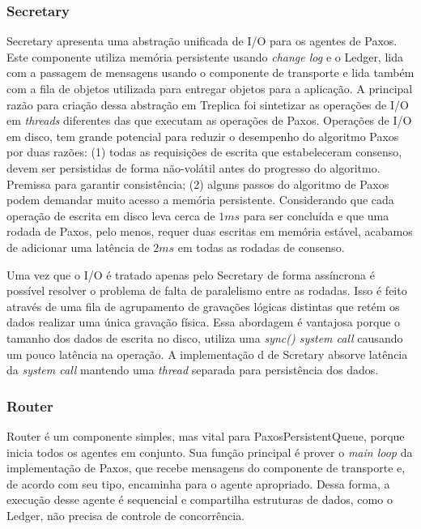 \subsubsection{Secretary}\label{subsec:secretary}

Secretary apresenta uma abstração unificada de I/O para os agentes de Paxos. Este
componente utiliza memória persistente usando \emph{change log} e o Ledger, lida com a
passagem de mensagens usando o componente de transporte e lida também com a fila de
objetos utilizada para entregar objetos para a aplicação. A principal razão para criação
dessa abstração em Treplica foi sintetizar as operações de I/O em \emph{threads}
diferentes das que executam as operações de Paxos. Operações de I/O em disco, tem grande
potencial para reduzir o desempenho do algoritmo Paxos por duas razões: (1) todas as
requisições de escrita que estabeleceram consenso, devem ser persistidas de forma
não-volátil antes do progresso do algoritmo. Premissa para garantir consistência; (2)
alguns passos do algoritmo de Paxos podem demandar muito acesso a memória persistente.
Considerando que cada operação de escrita em disco leva cerca de $1ms$ para ser concluída
e que uma rodada de Paxos, pelo menos, requer duas escritas em memória estável, acabamos
de adicionar uma latência de $2ms$ em todas as rodadas de consenso.

Uma vez que o I/O é tratado apenas pelo Secretary de forma assíncrona é possível resolver
o problema de falta de paralelismo entre as rodadas. Isso é feito através de uma fila de
agrupamento de gravações lógicas distintas que retém os dados realizar uma única gravação
física. Essa abordagem é vantajosa porque o tamanho dos dados de escrita no disco, utiliza
uma \emph{sync() system call} causando um pouco latência na operação. A implementação d
de Scretary absorve latência da \emph{system call} mantendo uma \emph{thread} separada
para persistência dos dados.

\subsubsection{Router}

Router é um componente simples, mas vital para PaxosPersistentQueue, porque inicia todos
os agentes em conjunto. Sua função principal é prover o \emph{main loop} da implementação
de Paxos, que recebe mensagens do componente de transporte e, de acordo com seu tipo,
encaminha para o agente apropriado. Dessa forma, a execução desse agente é sequencial e
compartilha estruturas de dados, como o Ledger, não precisa de controle de concorrência.

